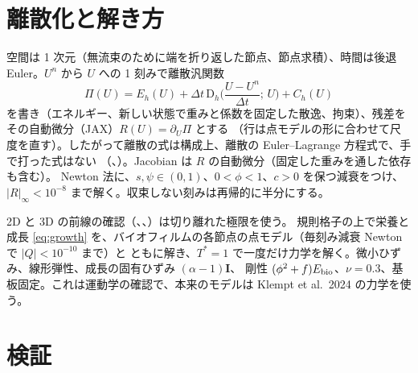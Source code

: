 \documentclass[11pt,a4paper]{article}
\theoremstyle{definition}
\newcommand{\D}{\mathrm{D}}
\begin{document}
\section{離散化と解き方}

空間は 1 次元（無流束のために端を折り返した節点、節点求積）、時間は後退 Euler。$U^n$ から $U$ への 1 刻みで離散汎関数
\[\Pi(U)=E_h(U)+\Delta t\,\D_h\Big(\frac{U-U^n}{\Delta t};\,U\Big)+C_h(U)\]
を書き（エネルギー、新しい状態で重みと係数を固定した散逸、拘束）、残差をその自動微分（JAX）$R(U)=\partial_U\Pi$ とする
（行は点モデルの形に合わせて尺度を直す）。したがって離散の式は構成上、離散の Euler--Lagrange 方程式で、手で打った式はない
（、）。Jacobian は $R$ の自動微分（固定した重みを通した依存も含む）。
Newton 法に、$s,\psi\in(0,1)$、$0<\phi<1$、$c>0$ を保つ減衰をつけ、$|R|_\infty<10^{-8}$ まで解く。収束しない刻みは再帰的に半分にする。

2D と 3D の前線の確認（、、）は切り離れた極限を使う。
規則格子の上で栄養と成長 \eqref{eq:growth} を、バイオフィルムの各節点の点モデル（毎刻み減衰 Newton で $|Q|<10^{-10}$ まで）と
ともに解き、$T^*=1$ で一度だけ力学を解く。微小ひずみ、線形弾性、成長の固有ひずみ $(\alpha-1)\mathbf I$、
剛性 $(\phi^2+f)E_{\rm bio}$、$\nu=0.3$、基板固定。これは運動学の確認で、本来のモデルは Klempt et al.\ 2024 の力学を使う。

\section{検証}
\end{document}
